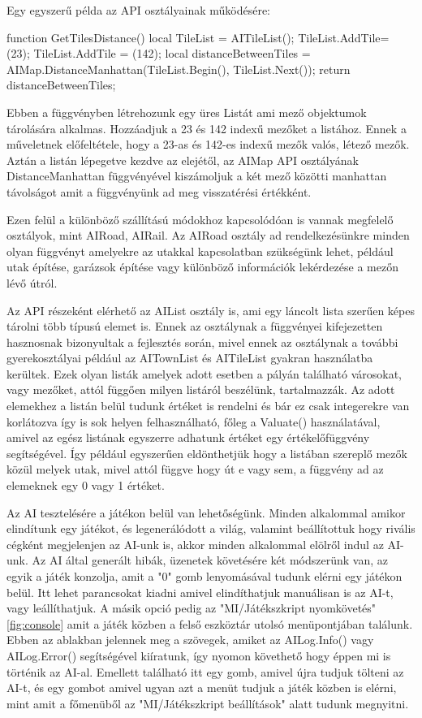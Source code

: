 Egy egyszerű példa az API osztályainak működésére:

\begin{cpp}
function GetTilesDistance()
{
  local TileList = AITileList();
  TileList.AddTile= (23);
  TileList.AddTile = (142);
  local distanceBetweenTiles =
  AIMap.DistanceManhattan(TileList.Begin(), TileList.Next());
  return distanceBetweenTiles;
}
\end{cpp}

Ebben a függvényben létrehozunk egy üres Listát ami mező objektumok tárolására alkalmas. Hozzáadjuk a 23 és 142 indexű mezőket a listához. Ennek a műveletnek előfeltétele, hogy a 23-as és 142-es indexű mezők valós, létező mezők. Aztán a listán lépegetve kezdve az elejétől, az AIMap API osztályának DistanceManhattan függvényével kiszámoljuk a két mező közötti manhattan távolságot amit a függvényünk ad meg visszatérési értékként.

Ezen felül a különböző szállítású módokhoz kapcsolódóan is vannak megfelelő osztályok, mint AIRoad, AIRail. Az AIRoad osztály ad rendelkezésünkre minden olyan függvényt amelyekre az utakkal kapcsolatban szükségünk lehet, például utak építése, garázsok építése vagy különböző információk lekérdezése a mezőn lévő útról.

Az API részeként elérhető az AIList osztály is, ami egy láncolt lista szerűen képes tárolni több típusú elemet is. Ennek az osztálynak a függvényei kifejezetten hasznosnak bizonyultak a fejlesztés során, mivel ennek az osztálynak a további gyerekosztályai például az AITownList és AITileList gyakran használatba kerültek. Ezek olyan listák amelyek adott esetben a pályán található városokat, vagy mezőket, attól függően milyen listáról beszélünk, tartalmazzák. Az adott elemekhez a listán belül tudunk értéket is rendelni és bár ez csak integerekre van korlátozva így is sok helyen felhasználható, főleg a Valuate() használatával, amivel az egész listának egyszerre adhatunk értéket egy értékelőfüggvény segítségével. Így például egyszerűen eldönthetjük hogy a listában szereplő mezők közül melyek utak, mivel attól függve hogy út e vagy sem, a függvény ad az elemeknek egy 0 vagy 1 értéket.


Az AI tesztelésére a játékon belül van lehetőségünk. Minden alkalommal amikor elindítunk egy játékot, és legenerálódott a világ, valamint beállítottuk hogy rivális cégként megjelenjen az AI-unk is, akkor minden alkalommal elölről indul az AI-unk. Az AI által generált hibák, üzenetek követésére két módszerünk van, az egyik a játék konzolja, amit a "0" gomb lenyomásával tudunk elérni egy játékon belül. Itt lehet parancsokat kiadni amivel elindíthatjuk manuálisan is az AI-t, vagy leállíthatjuk. A másik opció pedig az "MI/Játékszkript nyomkövetés"\ref{fig:console} amit a játék közben a felső eszköztár utolsó menüpontjában találunk. Ebben az ablakban jelennek meg a szövegek, amiket az AILog.Info() vagy AILog.Error() segítségével kiíratunk, így nyomon követhető hogy éppen mi is történik az AI-al. Emellett található itt egy gomb, amivel újra tudjuk tölteni az AI-t, és egy gombot amivel ugyan azt a menüt tudjuk a játék közben is elérni, mint amit a főmenüből az "MI/Játékszkript beállítások" alatt tudunk megnyitni.

